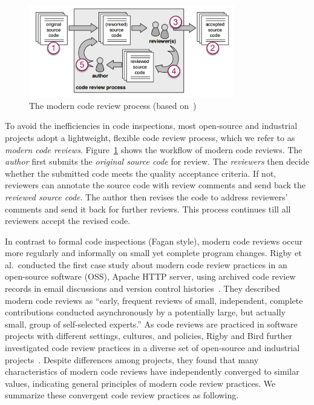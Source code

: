 \documentclass[runningheads,a4paper]{llncs}
\begin{document}
\begin{figure}[ht]
 \centering
 \includegraphics[width=0.8\textwidth]{images/review-process.png}
 \caption{The modern code review process (based on~\cite{beller2014modern})}
 \label{fig:review-process}
\end{figure}

To avoid the inefficiencies in code inspections, most open-source and industrial projects adopt a lightweight, flexible code review process, which we refer to as {\em modern code reviews}. Figure~\ref{fig:review-process} shows the workflow of modern code reviews. The {\em author} first submits the {\em original source code} for review. The {\em reviewers} then decide whether the submitted code meets the quality acceptance criteria. If not, reviewers can annotate the source code with review comments and send back the {\em reviewed source code}. The author then revises the code to address reviewers' comments and send it back for further reviews. This process continues till all reviewers accept the revised code.

In contrast to formal code inspections (Fagan style), modern code reviews occur more regularly and informally on small yet complete program changes. 
Rigby et al.~conducted the first case study about modern code review practices in an open-source software (OSS), Apache HTTP server, using archived code review records in email discussions and version control histories~\cite{rigby2008open}. They described modern code reviews as ``early, frequent reviews of small, independent, complete contributions conducted asynchronously by a potentially large, but actually small, group of self-selected experts.'' As code reviews are practiced in software projects with different settings, cultures, and policies, Rigby and Bird further investigated code review practices in a diverse set of open-source and industrial projects~\cite{rigby2013convergent}. Despite differences among projects, they found that many characteristics of modern code reviews have independently converged to similar values, indicating general principles of modern code review practices. We summarize these convergent code review practices as following.
\end{document}

